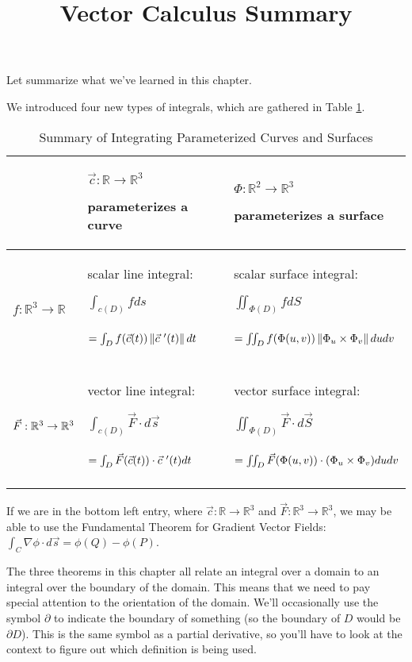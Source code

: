 \documentclass{amsart}
\title{Vector Calculus Summary}
\newcommand{\BBR}{\mathbb{R}}
\newcommand{\cvec}{\vec c}
\newcommand{\Fvec}{\vec F}
\newcommand{\dd}{d}
\newcommand{\ds}{\dd s}
\newcommand{\dS}{\dd S}
\newcommand{\dt}{\dd t}
\newcommand{\du}{\dd u}
\newcommand{\dv}{\dd v}
\newcommand{\dsvec}{\dd\vec s}
\newcommand{\dSvec}{\dd\vec S}
\newcommand{\grad}{\nabla}
\newcommand{\norm}[1]{\left\lVert #1\right\rVert}
\begin{document}
\maketitle

Let summarize what we've learned in this chapter.

We introduced four new types of integrals, which are gathered in Table \ref{tab:ints}.
\begin{table}[!ht]
 \begin{tabular}{|l|p{.3\linewidth}|p{.4\linewidth}|}\hline
  & $\cvec:\BBR\to\BBR^3$\par parameterizes a curve
  & $\Phi:\BBR^2\to\BBR^3$\par parameterizes a surface \\\hline
  $f:\BBR^3\to\BBR$
  & scalar line integral:\par
  $\int_{c(D)} f\ds$\par
  \quad$=\int_D f(\cvec(t))\norm{\cvec~'(t)}\dt \vphantom{\dfrac11}$
  & scalar surface integral:\par
  $\iint_{\Phi(D)} f\dS$\par
  \quad$=\iint_D f(\Phi(u,v))\norm{\Phi_u\times\Phi_v}\du\dv \vphantom{\dfrac11}$
  \\\hline
  $\Fvec:\BBR^3\to\BBR^3\vphantom{\dfrac11}$
  & vector line integral:\par
  $\int_{c(D)}\Fvec\cdot\dsvec$\par
  \quad$=\int_D\Fvec(\cvec(t))\cdot\cvec~'(t)\dt \vphantom{\dfrac11}$
  & vector surface integral:\par
  $\iint_{\Phi(D)}\Fvec\cdot\dSvec$\par
  \quad$=\iint_D\Fvec(\Phi(u,v))\cdot(\Phi_u\times\Phi_v)\du\dv \vphantom{\dfrac11}$
  \\\hline
 \end{tabular}
 \caption{Summary of Integrating Parameterized Curves and Surfaces}
 \label{tab:ints}
\end{table}
If we are in the bottom left entry, where $\cvec:\BBR\to\BBR^3$ and
$\Fvec:\BBR^3\to\BBR^3$, we may be able to use the Fundamental Theorem for
Gradient Vector Fields: $\int_C\grad\phi\cdot\dsvec=\phi(Q)-\phi(P)$.

The three theorems in this chapter all relate an integral over a domain to an
integral over the boundary of the domain.  This means that we need to pay
special attention to the orientation of the domain.  We'll occasionally use the
symbol $\partial$ to indicate the boundary of something (so the boundary of $D$
would be $\partial D$).  This is the same symbol as a partial derivative, so
you'll have to look at the context to figure out which definition is being
used.
\end{document}
